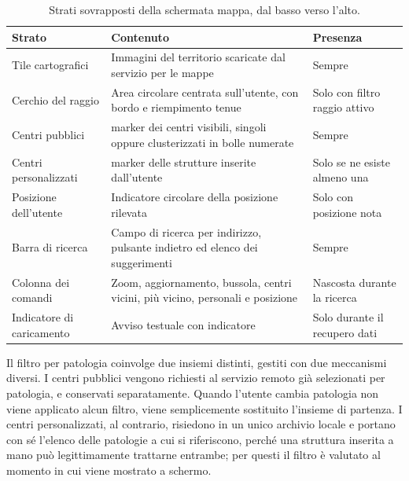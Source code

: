 \begin{table}[H]
\footnotesize
\begin{tabularx}{\textwidth}{@{}B{4.3cm} L P{2.8cm}@{}}
\toprule
\textbf{Strato} & \textbf{Contenuto} & \textbf{Presenza} \tabularnewline
\midrule
Tile cartografici & Immagini del territorio scaricate dal servizio per le mappe & Sempre \tabularnewline
Cerchio del raggio & Area circolare centrata sull'utente, con bordo e riempimento tenue & Solo con filtro raggio attivo \tabularnewline
Centri pubblici & marker dei centri visibili, singoli oppure clusterizzati in bolle numerate & Sempre \tabularnewline
Centri personalizzati & marker delle strutture inserite dall'utente & Solo se ne esiste almeno una \tabularnewline
Posizione dell'utente & Indicatore circolare della posizione rilevata & Solo con posizione nota \tabularnewline
Barra di ricerca & Campo di ricerca per indirizzo, pulsante indietro ed elenco dei suggerimenti & Sempre \tabularnewline
Colonna dei comandi & Zoom, aggiornamento, bussola, centri vicini, più vicino, personali e posizione & Nascosta durante la ricerca \tabularnewline
Indicatore di caricamento & Avviso testuale con indicatore & Solo durante il recupero dati \tabularnewline
\bottomrule
\end{tabularx}
\caption{Strati sovrapposti della schermata mappa, dal basso verso l'alto.}
\label{tab:strati}
\end{table}

Il filtro per patologia coinvolge due insiemi distinti, gestiti con due meccanismi diversi.
I centri pubblici vengono richiesti al servizio remoto già selezionati per patologia, e conservati separatamente.
Quando l'utente cambia patologia non viene applicato alcun filtro, viene semplicemente sostituito l'insieme di partenza.
I centri personalizzati, al contrario, risiedono in un unico archivio locale e portano con sé l'elenco delle patologie a
cui si riferiscono, perché una struttura inserita a mano può legittimamente trattarne entrambe; per questi il filtro è valutato
al momento in cui viene mostrato a schermo.

%


